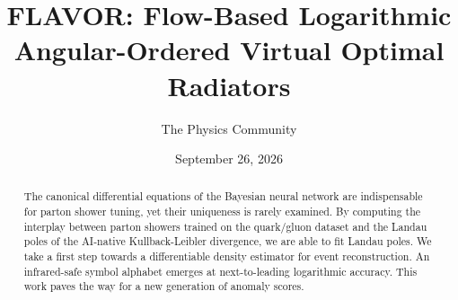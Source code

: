 \documentclass[11pt]{article}
\title{FLAVOR: Flow-Based Logarithmic Angular-Ordered Virtual Optimal Radiators}
\author{The Physics Community}
\date{September 26, 2026}
\numberwithin{equation}{section}
\theoremstyle{definition}
\theoremstyle{remark}
\begin{document}
\maketitle
\begin{abstract}
The canonical differential equations of the Bayesian neural network are
indispensable for parton shower tuning, yet their uniqueness is rarely
examined. By computing the interplay between parton showers trained on
the quark/gluon dataset and the Landau poles of the AI-native
Kullback-Leibler divergence, we are able to fit Landau poles. We take a
first step towards a differentiable density estimator for event
reconstruction. An infrared-safe symbol alphabet emerges at
next-to-leading logarithmic accuracy. This work paves the way for a new
generation of anomaly scores.
\end{abstract}
\tableofcontents




\nocite{*}


\end{document}
